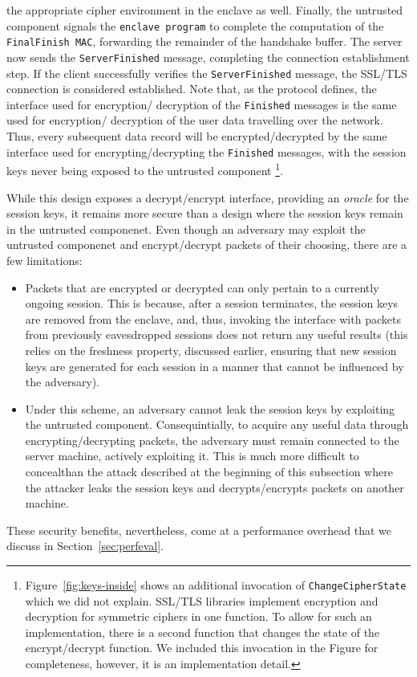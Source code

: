 \documentclass[../../main.tex]{subfiles}
\begin{document}
the appropriate cipher environment in the enclave as well. Finally,
the untrusted component signals the \texttt{enclave program} to
complete the computation of the \texttt{FinalFinish MAC}, forwarding
the remainder of the handshake buffer. The server now sends the
\texttt{ServerFinished} message, completing the connection
establishment step. If the client successfully verifies the
\texttt{ServerFinished} message, the SSL/TLS connection is considered
established. Note that, as the protocol defines, the interface used
for encryption/ decryption of the \texttt{Finished} messages is the
same used for encryption/ decryption of the user data travelling over
the network. Thus, every subsequent data record will be
encrypted/decrypted by the same interface used for
encrypting/decrypting the \texttt{Finished} messages, with the session
keys never being exposed to the untrusted component
\footnote{Figure~\ref{fig:keys-inside} shows an additional invocation
  of \texttt{Change\-Cipher\-State} which we did not explain. SSL/TLS
  libraries implement encryption and decryption for symmetric ciphers
  in one function. To allow for such an implementation, there is a
  second function that changes the state of the encrypt/decrypt
  function. We included this invocation in the Figure for
  completeness, however, it is an implementation detail.}.

While this design exposes a decrypt/encrypt interface, providing an
\textit{oracle} for the session keys, it remains more secure than a
design where the session keys remain in the untrusted componenet. Even
though an adversary may exploit the untrusted componenet and
encrypt/decrypt packets of their choosing, there are a few
limitations:
\begin{itemize}
  \item Packets that are encrypted or decrypted can only pertain to
    a currently ongoing session. This is because, after a session
    terminates, the session keys are removed from the enclave, and, thus,
    invoking the interface with packets from previously eavesdropped
    sessions does not return any useful results (this relies on the
    freshness property, discussed earlier, ensuring that new session keys
    are generated for each session in a manner that cannot be influenced
    by the adversary).
  \item Under this scheme, an adversary cannot leak the session keys
    by exploiting the untrusted component. Consequintially, to acquire
    any useful data through encrypting/decrypting packets, the adversary
    must remain connected to the server machine, actively exploiting it.
    This is much more difficult to concealthan the attack described
    at the beginning of this subsection where the attacker leaks the session
    keys and decrypts/encrypts packets on another machine.
\end{itemize}
These security benefits, nevertheless, come at a performance overhead
that we discuss in Section~\ref{sec:perfeval}.
\end{document}
